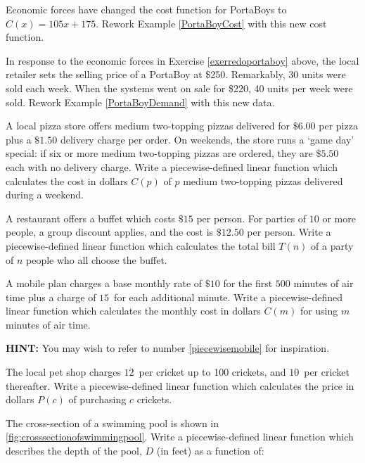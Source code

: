 \begin{exenum}
\item \label{exerredoportaboy} Economic forces have changed the cost function for PortaBoys to $C(x) = 105x + 175$.  Rework Example \ref{PortaBoyCost} with this new cost function.

\item In response to the economic forces in Exercise \ref{exerredoportaboy} above, the local retailer sets the selling price of a PortaBoy at \$250.  Remarkably, 30 units were sold each week.  When the systems went on sale for \$220, 40 units per week were sold.  Rework Example \ref{PortaBoyDemand}  with this new data.

\item A local pizza store offers medium two-topping pizzas delivered for $\$6.00$ per pizza plus a $\$1.50$ delivery charge per order.  On weekends, the store runs a `game day' special:  if six or more medium two-topping pizzas are ordered, they are $\$5.50$ each with no delivery charge.  Write a piecewise-defined linear function which calculates the cost in dollars $C(p)$ of  $p$ medium two-topping pizzas delivered during a weekend.

\item  A restaurant offers a buffet which costs $\$15$ per person.  For parties of $10$ or more people, a group discount applies, and the cost is $\$12.50$ per person.   Write a piecewise-defined linear function which calculates the total bill $T(n)$ of a party of $n$ people who all choose the buffet.

\item  A mobile plan charges a base monthly rate of $\$10$ for the first $500$ minutes of air time plus a charge of $15$\textcent \, for each additional minute.  Write a piecewise-defined linear function which calculates the monthly cost in dollars  $C(m)$  for using $m$ minutes of air time.

\textbf{HINT:}  You may wish to refer to number \ref{piecewisemobile} for inspiration.

\item  The local pet shop charges $12$\textcent \, per cricket up to 100 crickets, and $10$\textcent \, per cricket thereafter.  Write a piecewise-defined linear function which calculates the price in dollars $P(c)$ of purchasing $c$ crickets.

\item  The cross-section of a swimming pool is shown in \autoref{fig:crosssectionofswimmingpool}.  Write a piecewise-defined linear function which describes the depth of the pool, $D$ (in feet) as a function of:


\end{exenum}
